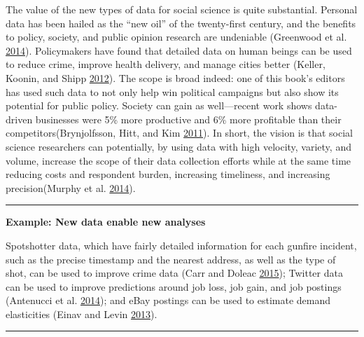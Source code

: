 \documentclass[]{krantz}
\begin{document}
The value of the new types of data for social science is quite
substantial. Personal data has been hailed as the ``new oil'' of the
twenty-first century, and the benefits to policy, society, and public
opinion research are undeniable (Greenwood et al.
\protect\hyperlink{ref-greenwood2014}{2014}). Policymakers have found
that detailed data on human beings can be used to reduce crime, improve
health delivery, and manage cities better (Keller, Koonin, and Shipp
\protect\hyperlink{ref-keller2012big}{2012}). The scope is broad indeed:
one of this book's editors has used such data to not only help win
political campaigns but also show its potential for public policy.
Society can gain as well---recent work shows data-driven businesses were
5\% more productive and 6\% more profitable than their
competitors(Brynjolfsson, Hitt, and Kim
\protect\hyperlink{ref-brynjolfsson2011strength}{2011}). In short, the
vision is that social science researchers can potentially, by using data
with high velocity, variety, and volume, increase the scope of their
data collection efforts while at the same time reducing costs and
respondent burden, increasing timeliness, and increasing
precision(Murphy et al. \protect\hyperlink{ref-murphy2014social}{2014}).

\begin{center}\rule{0.5\linewidth}{\linethickness}\end{center}

\textbf{Example: New data enable new analyses}

Spotshotter data, which have fairly detailed information for each
gunfire incident, such as the precise timestamp and the nearest address,
as well as the type of shot, can be used to improve crime data (Carr and
Doleac \protect\hyperlink{ref-carr2015geography}{2015}); Twitter data
can be used to improve predictions around job loss, job gain, and job
postings (Antenucci et al.
\protect\hyperlink{ref-antenucci2014using}{2014}); and eBay postings can
be used to estimate demand elasticities (Einav and Levin
\protect\hyperlink{ref-einav2013data}{2013}).

\begin{center}\rule{0.5\linewidth}{\linethickness}\end{center}
\end{document}
